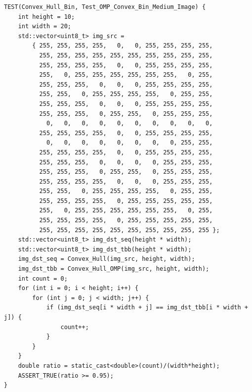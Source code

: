 \documentclass{report}
\begin{document}
\begin{lstlisting}
TEST(Convex_Hull_Bin, Test_OMP_Convex_Bin_Medium_Image) {
    int height = 10;
    int width = 20;
    std::vector<uint8_t> img_src =
        { 255, 255, 255, 255,   0,   0, 255, 255, 255, 255,
          255, 255, 255, 255, 255, 255, 255, 255, 255, 255,
          255, 255, 255, 255,   0,   0, 255, 255, 255, 255,
          255,   0, 255, 255, 255, 255, 255, 255,   0, 255,
          255, 255, 255,   0,   0,   0, 255, 255, 255, 255,
          255, 255,   0, 255, 255, 255, 255,   0, 255, 255,
          255, 255, 255,   0,   0,   0, 255, 255, 255, 255,
          255, 255, 255,   0, 255, 255,   0, 255, 255, 255,
            0,   0,   0,   0,   0,   0,   0,   0,   0,   0,
          255, 255, 255, 255,   0,   0, 255, 255, 255, 255,
            0,   0,   0,   0,   0,   0,   0,   0, 255, 255,
          255, 255, 255, 255,   0,   0, 255, 255, 255, 255,
          255, 255, 255,   0,   0,   0,   0, 255, 255, 255,
          255, 255, 255,   0, 255, 255,   0, 255, 255, 255,
          255, 255, 255, 255,   0,   0,   0, 255, 255, 255,
          255, 255,   0, 255, 255, 255, 255,   0, 255, 255,
          255, 255, 255, 255,   0, 255, 255, 255, 255, 255,
          255,   0, 255, 255, 255, 255, 255, 255,   0, 255,
          255, 255, 255, 255,   0, 255, 255, 255, 255, 255,
          255, 255, 255, 255, 255, 255, 255, 255, 255, 255 };
    std::vector<uint8_t> img_dst_seq(height * width);
    std::vector<uint8_t> img_dst_tbb(height * width);
    img_dst_seq = Convex_Hull(img_src, height, width);
    img_dst_tbb = Convex_Hull_OMP(img_src, height, width);
    int count = 0;
    for (int i = 0; i < height; i++) {
        for (int j = 0; j < width; j++) {
            if (img_dst_seq[i * width + j] == img_dst_tbb[i * width + j]) {
                count++;
            }
        }
    }
    double ratio = static_cast<double>(count)/(width*height);
    ASSERT_TRUE(ratio >= 0.95);
}


\end{lstlisting}
\end{document}
